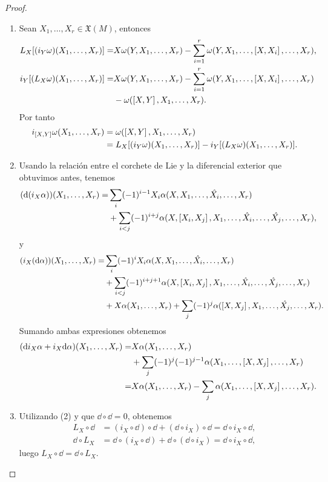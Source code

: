 \begin{proof}\leavevmode
  \begin{enumerate}
    \item Sean $X_1,\dots,X_r \in \mathfrak{X}(M)$, entonces
      \begin{align*}
	L_X[(i_Y \omega) (X_1,\dots,X_r)] =& X \omega(Y,X_1,\dots,X_r)-\sum_{i=1}^r \omega(Y,X_1,\dots,\left[X,X_i\right],\dots,X_r), \\
	i_Y[(L_X \omega) (X_1,\dots,X_r)] =&  X \omega(Y,X_1,\dots,X_r) -\sum_{i=1}^r \omega(Y,X_1,\dots,\left[X,X_i\right],\dots,X_r) \\
	&- \omega(\left[X,Y\right],X_1,\dots,X_r).
      \end{align*}
      Por tanto
      \begin{align*}
	i_{\left[X,Y\right]}\omega (X_1,\dots,X_r) &=\omega(\left[X,Y\right],X_1,\dots,X_r) \\
	&= L_X[(i_Y \omega) (X_1,\dots,X_r)]-i_Y[(L_X \omega) (X_1,\dots,X_r)].
      \end{align*}
    \item Usando la relación entre el corchete de Lie y la diferencial exterior que obtuvimos antes, tenemos
      \begin{align*}
	(\mathrm{d} (i_X \alpha)) (X_1,\dots,X_r) =& \sum_{i}(-1)^{i-1}X_i \alpha(X,X_1,\dots,\hat{X_i},\dots,X_r) \\
	& + \sum_{i<j} (-1)^{i+j} \alpha (X,\left[X_i,X_j\right],X_1,\dots,\hat{X_i},\dots,\hat{X_j},\dots,X_r),
      \end{align*}
      y
      \begin{align*}
	(i_X (\mathrm{d} \alpha)) (X_1,\dots,X_r) =& \sum_{i}(-1)^{i}X_i \alpha(X,X_1,\dots,\hat{X_i},\dots,X_r) \\
	& + \sum_{i<j} (-1)^{i+j+1} \alpha (X,\left[X_i,X_j\right],X_1,\dots,\hat{X_i},\dots,\hat{X_j},\dots,X_r) \\
	& + X\alpha(X_1,\dots,X_r) + \sum_j (-1)^{j} \alpha (\left[X,X_j\right],X_1,\dots,\hat{X_j},\dots,X_r).
      \end{align*}
      Sumando ambas expresiones obtenemos
      \begin{align*}
	(\mathrm{d} i_X \alpha +i_X \mathrm{d} \alpha) (X_1,\dots,X_r) = & X\alpha(X_1,\dots,X_r) \\
	& + \sum_j (-1)^{j} (-1)^{j-1} \alpha (X_1,\dots,\left[X,X_j\right],\dots,X_r) \\
	= & X\alpha(X_1,\dots,X_r) - \sum_j \alpha (X_1,\dots,\left[X,X_j\right],\dots,X_r). 
      \end{align*}
    \item Utilizando (2) y que $\dd \circ \dd=0$, obtenemos
      \begin{align*}
	L_X \circ \dd &= (i_X \circ \dd) \circ \dd + (\dd \circ i_X) \circ \dd = \dd \circ i_X \circ \dd, \\
	\dd \circ L_X &= \dd \circ (i_X \circ \dd) + \dd \circ (\dd \circ i_X) = \dd \circ i_X \circ \dd,
      \end{align*}
      luego $L_X \circ \dd= \dd \circ L_X$.
  \end{enumerate}
\end{proof}

